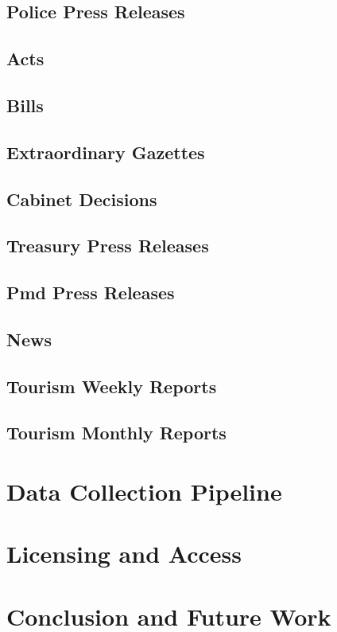 \documentclass[11pt]{article}
\begin{document}
\subsection{Police Press Releases}



\subsection{Acts}



\subsection{Bills}



\subsection{Extraordinary Gazettes}



\subsection{Cabinet Decisions}



\subsection{Treasury Press Releases}



\subsection{Pmd Press Releases}



\subsection{News}



\subsection{Tourism Weekly Reports}



\subsection{Tourism Monthly Reports}


\section{Data Collection Pipeline}

\section{Licensing and Access}

\section{Conclusion and Future Work}



\end{document}
